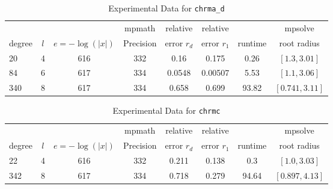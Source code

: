 \documentclass[sigconf]{acmart}
\begin{document}
\begin{table}[t]
\caption{Experimental Data for \texttt{chrma\_d}} %
\label{tab:chrma_d}
\vskip -0.15in
\begin{center}
\begin{small}
\begin{sc}
\begin{tabular}{lccccccc}
\toprule
&  &  & mpmath & relative  & relative &  & mpsolve \\
degree  & $l$& $e=-\log(|x|)$& Precision &error $r_d$       & error $r_1$ &runtime& root radius\\
\midrule
20 & 4 & 616 & 332 & 0.16 & 0.175 & 0.26 & $[1.3, 3.01]$\\
 84 & 6 & 617 & 334 & 0.0548 & 0.00507 & 5.53 & $[1.1, 3.06]$\\
 340 & 8 & 617 & 334 & 0.658 & 0.699 & 93.82 & $[0.741, 3.11]$\\
\bottomrule
\end{tabular}
\end{sc}
\end{small}
\end{center}
\vskip 0.05in
\end{table}


\begin{table}[t]
\caption{Experimental Data for \texttt{chrmc}} %
\label{tab:chrmc}
\vskip -0.15in
\begin{center}
\begin{small}
\begin{sc}
\begin{tabular}{lccccccc}
\toprule
&  &  & mpmath & relative  & relative &  & mpsolve \\
degree  & $l$& $e=-\log(|x|)$& Precision &error $r_d$       & error $r_1$ &runtime& root radius\\
\midrule
 22 & 4 & 616 & 332 & 0.211 & 0.138 & 0.3 & $[1.0, 3.03]$\\
 342 & 8 & 617 & 334 & 0.718 & 0.279 & 94.64 & $[0.897, 4.13]$\\
\bottomrule
\end{tabular}
\end{sc}
\end{small}
\end{center}
\vskip 0.05in
\end{table}
\end{document}
